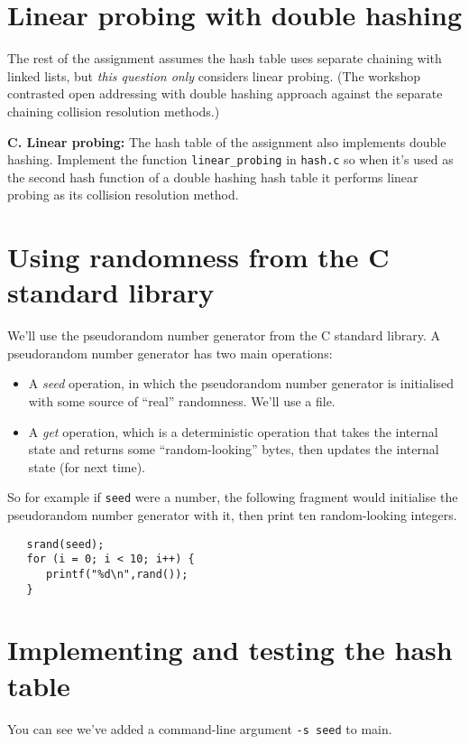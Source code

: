 \documentclass[11pt]{article}
\begin{document}
\section*{Linear probing with double hashing}
The rest of the assignment assumes the hash table uses separate chaining with linked lists, but \emph{this question only} considers linear probing.   (The workshop contrasted open addressing with double hashing approach against the separate chaining collision resolution methods.)

\begin{description}
    \item{\bf C. Linear probing:}
        The hash table of the assignment also implements double hashing.
        Implement the function \texttt{linear\_probing} in \texttt{hash.c}
        so when it's used as the second hash function of a double hashing hash table it performs linear probing as its collision resolution method.
\end{description}

\section*{Using randomness from the C standard library}
We'll use the pseudorandom number generator from the C standard library.
A pseudorandom number generator has two main operations:
\begin{itemize}
\item A \emph{seed} operation, in which the pseudorandom number generator is
    initialised with some source of ``real'' randomness.  We'll use a file.
\item A \emph{get} operation, which is a deterministic operation that takes the
    internal state and returns some ``random-looking'' bytes, then updates the
        internal state (for next time).
\end{itemize}
So for example if \texttt{seed} were a number,
the following fragment would initialise the pseudorandom number generator with it,
then print ten random-looking integers.

\newpage
\begin{verbatim}
   srand(seed);
   for (i = 0; i < 10; i++) {
      printf("%d\n",rand());
   }
\end{verbatim}

\section*{Implementing and testing the hash table}
You can see we've added a command-line argument \texttt{-s seed} to main.
\end{document}
